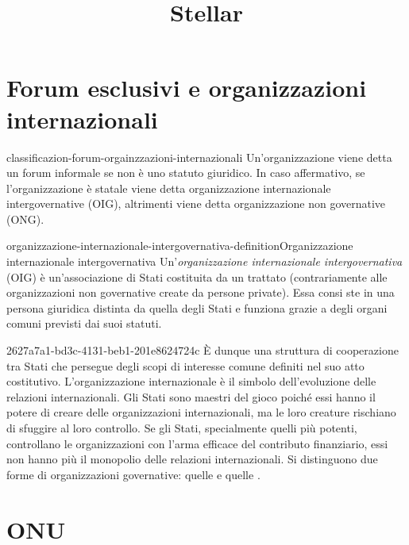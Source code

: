 \documentclass[preview]{standalone}
\begin{document}
\title{Stellar}
\genpage

\section{Forum esclusivi e organizzazioni internazionali}

\begin{snippet}{classificazion-forum-orgainzzazioni-internazionali}
    Un'organizzazione viene detta un forum informale se non è uno statuto giuridico.
    In caso affermativo, se l'organizzazione è statale viene detta
    organizzazione internazionale intergovernative (OIG), altrimenti viene detta
    organizzazione non governative (ONG).
\end{snippet}

\begin{snippetdefinition}{organizzazione-internazionale-intergovernativa-definition}{Organizzazione internazionale intergovernativa}
    Un'\textit{organizzazione internazionale intergovernativa} (OIG) è un'associazione di Stati costituita da un
    trattato (contrariamente alle organizzazioni non governative create da persone private).
    Essa consi ste in una persona giuridica distinta da quella degli Stati e funziona grazie a degli organi comuni
    previsti dai suoi statuti.
\end{snippetdefinition}

\begin{snippet}{2627a7a1-bd3c-4131-beb1-201e8624724c}
    È dunque una struttura di cooperazione tra Stati che persegue degli scopi di
    interesse comune definiti nel suo atto costitutivo.
    L'organizzazione internazionale è il simbolo dell'evoluzione delle relazioni internazionali. Gli Stati
    sono maestri del gioco poiché essi hanno il potere di creare delle organizzazioni internazionali, ma
    le loro creature rischiano di sfuggire al loro controllo. Se gli Stati, specialmente quelli più potenti,
    controllano le organizzazioni con l'arma efficace del contributo finanziario, essi non hanno più il monopolio delle relazioni internazionali.
    Si distinguono due forme di organizzazioni governative: quelle  e quelle .
\end{snippet}


\section{ONU}
\end{document}
